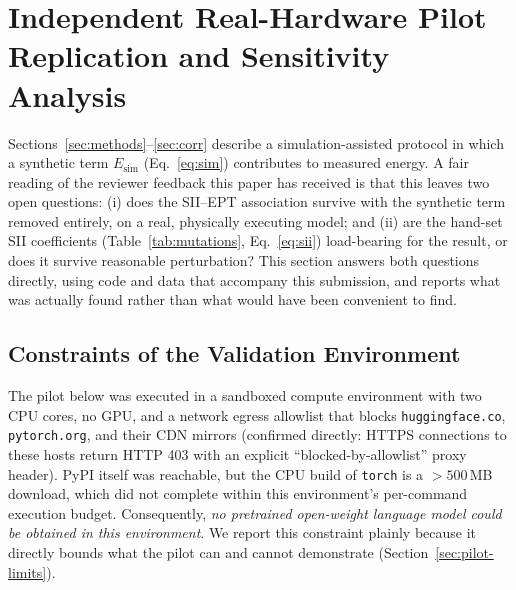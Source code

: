 \documentclass[conference]{IEEEtran}
\begin{document}
\section{Independent Real-Hardware Pilot Replication and Sensitivity Analysis}
\label{sec:pilot}
Sections~\ref{sec:methods}--\ref{sec:corr} describe a
simulation-assisted protocol in which a synthetic term
$E_\text{sim}$ (Eq.~\ref{eq:sim}) contributes to measured energy. A
fair reading of the reviewer feedback this paper has received is that
this leaves two open questions: (i) does the SII--EPT association
survive with the synthetic term removed entirely, on a real,
physically executing model; and (ii) are the hand-set SII coefficients
(Table~\ref{tab:mutations}, Eq.~\ref{eq:sii}) load-bearing for the
result, or does it survive reasonable perturbation? This section
answers both questions directly, using code and data that accompany
this submission, and reports what was actually found rather than what
would have been convenient to find.
\subsection{Constraints of the Validation Environment}
\label{sec:pilot-constraints}
The pilot below was executed in a sandboxed compute environment with
two CPU cores, no GPU, and a network egress allowlist that blocks
\texttt{huggingface.co}, \texttt{pytorch.org}, and their CDN mirrors
(confirmed directly: HTTPS connections to these hosts return HTTP 403
with an explicit ``blocked-by-allowlist'' proxy header). PyPI itself
was reachable, but the CPU build of \texttt{torch} is a $>500$\,MB
download, which did not complete within this environment's
per-command execution budget. Consequently, \emph{no pretrained
open-weight language model could be obtained in this environment}. We
report this constraint plainly because it directly bounds what the
pilot can and cannot demonstrate (Section~\ref{sec:pilot-limits}).
\end{document}
